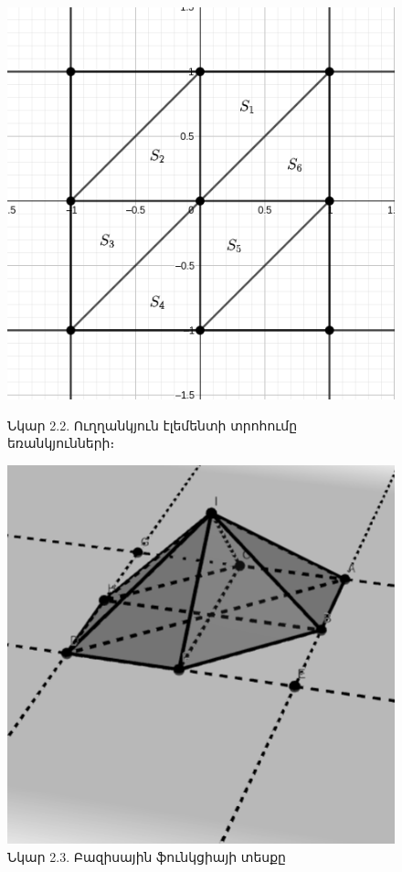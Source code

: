 \documentclass[fleqn, bachelor,subf,12pt,notitlepage]{article}
\begin{document}
\begin{figure}[h!]
  \centering
  \begin{minipage}[b]{0.4\textwidth}
    \includegraphics[width=\textwidth]{images/two_var_courant_1}
    \captionsetup{labelformat=empty}
    \caption{Նկար 2.2. Ուղղանկյուն էլեմենտի տրոհումը եռանկյունների։}
  \end{minipage}
  \hfill
  \begin{minipage}[b]{0.4\textwidth}
    \includegraphics[width=\textwidth]{images/two_var_courant_2}
    \captionsetup{labelformat=empty}
    \caption{Նկար 2.3. Բազիսային ֆունկցիայի տեսքը}
  \end{minipage}
\end{figure}
\end{document}
